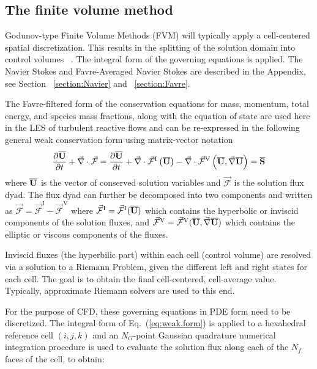 \subsection{The finite volume method}
Godunov-type Finite Volume Methods (FVM) will typically apply a cell-centered spatial discretization. This results in the splitting of the solution domain into control volumes ~\cite{Toro:1997}. The integral form of the governing equations is applied. The Navier Stokes and Favre-Averaged Navier Stokes are described in the Appendix, see Section ~\ref{section:Navier} and ~\ref{section:Favre}.\par 
The Favre-filtered form of the conservation equations for mass, momentum, total energy, and species mass fractions, along with the equation of state are used here in the LES of turbulent reactive flows and can be re-expressed in the following general weak conservation form using matrix-vector notation ~\cite{Neto:2014}
\begin{equation}
\label{eq:weak.form}
\frac{\partial \overline{\mathbf{U}}}{\partial t} 
+ \vec{\nabla} \cdot \vec{\mathcal{F}} =
\frac{\partial \overline{\mathbf{U}}}{\partial t} + 
\vec{\nabla} \cdot \vec{\mathcal{F}}^{\mathrm{I}} \left( \overline{\mathbf{U}} \right) - 
\vec{\nabla} \cdot \vec{\mathcal{F}}^{\mathrm{V}} 
\left( \overline{\mathbf{U}}, \vec{\nabla} \overline{\mathbf{U}} \right) = 
\overline{\mathbf{S}}
\end{equation}
where $\overline{\mathbf{U}}$ is the vector of conserved solution variables and $\vec{\mathcal{F}}$ is the solution flux dyad.  The flux dyad can further be decomposed into two components and written as $\vec{\mathcal{F}} =  \vec{\mathcal{F}}^{\mathrm I} - \vec{\mathcal{F}}^{\mathrm{V}}$ where $\vec{\mathcal{F}}^{\mathrm I} = \vec{\mathcal{F}}^{\mathrm I}(\overline{\mathbf{U}})$ which contains the hyperbolic or inviscid components of the solution fluxes, and  $\vec{\mathcal{F}}^{\mathrm{V}} =  \vec{\mathcal{F}}^{\mathrm{V}}(\overline{\mathbf{U}}, \vec{\nabla} \overline{\mathbf{U}})$ which contains the elliptic or viscous components of the fluxes.

Inviscid fluxes (the hyperbilic part) within each cell (control volume) are resolved via a solution to a Riemann Problem, given the different left and right states for each cell. The goal is to obtain the final cell-centered, cell-average value. Typically, approximate Riemann solvers are used to this end.

For the purpose of CFD, these governing equations in PDE form need to be discretized. The integral form of Eq.~(\ref{eq:weak.form}) is applied to a hexahedral reference cell $(i,j,k)$ and an $N_G$-point Gaussian quadrature numerical integration procedure is used to evaluate the solution flux along each of the $N_f$ faces of the cell, to obtain:

